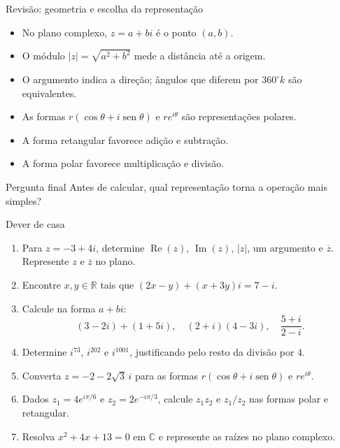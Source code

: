 \documentclass[aspectratio=169]{beamer}
\newcommand{\sen}{\operatorname{sen}}
\begin{document}
\begin{frame}{Revisão: geometria e escolha da representação}
\vspace{-0.45em}
\small
\begin{itemize}
  \setlength{\itemsep}{5pt}
  \item No plano complexo, $z=a+bi$ é o ponto $(a,b)$.
  \item O módulo $|z|=\sqrt{a^2+b^2}$ mede a distância até a origem.
  \item O argumento indica a direção; ângulos que diferem por $360^\circ k$ são equivalentes.
  \item As formas $r(\cos\theta+i\sen\theta)$ e $re^{i\theta}$ são representações polares.
  \item A forma retangular favorece adição e subtração.
  \item A forma polar favorece multiplicação e divisão.
\end{itemize}
\begin{block}{Pergunta final}
Antes de calcular, qual representação torna a operação mais simples?
\end{block}
\end{frame}

\begin{frame}{Dever de casa}
\vspace{-0.55em}
\scriptsize
\begin{enumerate}
  \setlength{\itemsep}{2.5pt}
  \item Para $z=-3+4i$, determine $\operatorname{Re}(z)$, $\operatorname{Im}(z)$, $|z|$, um argumento e $\overline z$. Represente $z$ e $\overline z$ no plano.
  \item Encontre $x,y\in\mathbb{R}$ tais que $(2x-y)+(x+3y)i=7-i$.
  \item Calcule na forma $a+bi$:
  \[
    (3-2i)+(1+5i),\quad (2+i)(4-3i),\quad \frac{5+i}{2-i}.
  \]
  \item Determine $i^{73}$, $i^{202}$ e $i^{1001}$, justificando pelo resto da divisão por $4$.
  \item Converta $z=-2-2\sqrt3\,i$ para as formas $r(\cos\theta+i\sen\theta)$ e $re^{i\theta}$.
  \item Dados $z_1=4e^{i\pi/6}$ e $z_2=2e^{-i\pi/3}$, calcule $z_1z_2$ e $z_1/z_2$ nas formas polar e retangular.
  \item Resolva $x^2+4x+13=0$ em $\mathbb{C}$ e represente as raízes no plano complexo.
\end{enumerate}
\end{frame}
\end{document}
